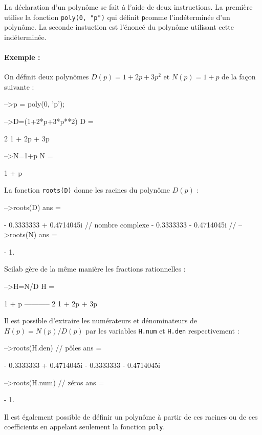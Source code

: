 La déclaration d'un polynôme se fait à l'aide de deux instructions. 
La première utilise la fonction \verb?poly(0, "p")? qui définit 
\og \verb?p?\fg comme l'indéterminée d'un polynôme. 
La seconde instuction est l'énoncé du polynôme utilisant cette indéterminée. 
\paragraph{Exemple :}
On définit deux polynômes $D(p)=1+2p+3p^2$ et $N(p)=1+p$ de la façon 
suivante :
\begin{Scilabcode}
-->p = poly(0, 'p');

-->D=(1+2*p+3*p**2)
 D  =
 
               2  
    1 + 2p + 3p 

-->N=1+p
 N  =
 
    1 + p
\end{Scilabcode}
La fonction \verb?roots(D)? donne les racines du polynôme $D(p)$ :
\begin{Scilabcode}
-->roots(D)
 ans  =
 
  - 0.3333333 + 0.4714045i     // nombre complexe 
  - 0.3333333 - 0.4714045i     // 
-->roots(N)
 ans  =
  
   - 1.
\end{Scilabcode}

Scilab gère de la même manière les fractions rationnelles :
\begin{Scilabcode}
-->H=N/D
 H  =
 
       1 + p      
    -----------   
               2  
    1 + 2p + 3p 
\end{Scilabcode}

Il est possible d'extraire les numérateurs et dénominateurs de 
$H(p)=N(p)/D(p)$ par les variables \verb?H.num? et \verb?H.den? 
respectivement :
\begin{Scilabcode}
-->roots(H.den)               // pôles
 ans  =
 
  - 0.3333333 + 0.4714045i  
  - 0.3333333 - 0.4714045i

-->roots(H.num)               // zéros
 ans  =
 
  - 1.
\end{Scilabcode}
Il est également possible de définir un polynôme à partir de ces racines 
ou de ces coefficients en appelant seulement la fonction \verb?poly?.
